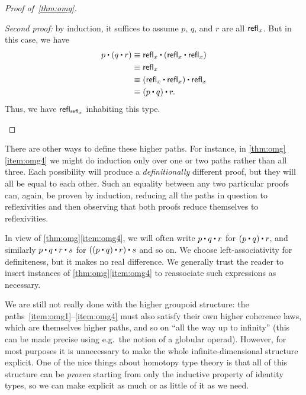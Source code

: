 \begin{proof}[Proof of~\autoref{thm:omg}]
\begin{enumerate}
    \mentalpause

    \noindent \emph{Second proof:} by induction, it suffices to assume $p$, $q$, and $r$ are all $\mathsf{refl}_{x}$.
    But in this case, we have
    \begin{align*}
      p\ct (q\ct r)
      &\jdeq \refl{x}\ct(\refl{x}\ct \refl{x})\\
      &\jdeq \refl{x}\\
      &\jdeq (\refl{x}\ct \refl x)\ct \refl x\\
      &\jdeq (p\ct q)\ct r.
    \end{align*}
    Thus, we have $\mathsf{refl}_{\mathsf{refl}_{x}}$ inhabiting this type. \qedhere
  \end{enumerate}
\end{proof}

\begin{rmk}
  There are other ways to define these higher paths.
  For instance, in \autoref{thm:omg}\ref{item:omg4} we might do induction only over one or two paths rather than all three.
  Each possibility will produce a \emph{definitionally} different proof, but they will all be equal to each other.
  Such an equality between any two particular proofs can, again, be proven by induction, reducing all the paths in question to reflexivities and then observing that both proofs reduce themselves to reflexivities.
\end{rmk}

In view of \autoref{thm:omg}\ref{item:omg4}, we will often write $p\ct q\ct r$ for $(p\ct q)\ct r$, and similarly $p\ct q\ct r \ct s$ for $((p\ct q)\ct r)\ct s$ and so on.
We choose left-associativity for definiteness, but it makes no real difference.
We generally trust the reader to insert instances of \autoref{thm:omg}\ref{item:omg4} to reassociate such expressions as necessary.

We are still not really done with the higher groupoid structure: the paths~\ref{item:omg1}--\ref{item:omg4} must also satisfy their own higher coherence laws, which are themselves higher paths,
%
%
%
%
and so on ``all the way up to infinity'' (this can be made precise using e.g.\ the notion of a globular operad).
However, for most purposes it is unnecessary to make the whole infinite-dimensional structure explicit.
One of the nice things about homotopy type theory is that all of this structure can be \emph{proven} starting from only the inductive property of identity types, so we can make explicit as much or as little of it as we need.

